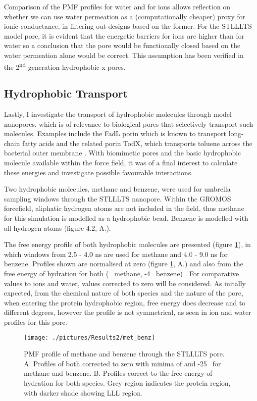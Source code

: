 Comparison of the PMF profiles for water and for ions allows reflection on whether we can use water permeation as a (computationally cheaper) proxy for ionic conductance, in filtering out designs based on the former. For the STLLLTS model pore, it is evident that the energetic barriers for ions are higher than for water so a conclusion that the pore would be functionally closed based on the water permeation alone would be correct. This assumption has been verified in the 2\textsuperscript{nd} generation hydrophobic-x pores. 

\subsection{Hydrophobic Transport}

Lastly, I investigate the transport of hydrophobic molecules through model nanopores, which is of relevance to biological pores that selectively transport such molecules. Examples include the FadL porin which is known to transport long-chain fatty acids \cite{VandenBerg2004b,Zou2008} and the related porin TodX, which transports toluene across the bacterial outer membrane \cite{Hearn2008}. With biomimetic pores and the basic hydrophobic molecule available within the force field, it was of a final interest to calculate these energies and investigate possible favourable interactions.

Two hydrophobic molecules, methane and benzene, were used for umbrella sampling windows through the STLLLTS nanopore. Within the GROMOS forcefield, aliphatic hydrogen atoms are not included in the field, thus methane for this simulation is modelled as a hydrophobic bead. Benzene is modelled with all hydrogen atoms (figure 4.2, A.).

The free energy profile of both hydrophobic molecules are presented (figure \ref{fig:met_benz}), in which windows from 2.5 - 4.0 ns are used for methane and 4.0 - 9.0 ns for benzene. Profiles shown are normalised at zero (figure \ref{fig:met_benz}, A.) and also from the free energy of hydration for both ( \kj\ methane, -4 \kj\ benzene) \cite{Abraham1984}. For comparative values to ions and water, values corrected to zero will be considered.  As initally expected, from the chemical nature of both species and the nature of the pore, when entering the protein hydrophobic region, free energy does decrease and to different degrees, however the profile is not symmetrical, as seen in ion and water profiles for this pore. 


\begin{figure}[H]
\begin{center}
\texttt{[image: ./pictures/Results2/met\_benz]}
\caption[PMF profile of methane and benzene through the STLLLTS pore.] {PMF profile of methane and benzene through the STLLLTS pore. A. Profiles of both corrected to zero with minima of  and -25 \kj\ for methane and benzene. B. Profiles correct to the free energy of hydration for both species. Grey region indicates the protein region, with darker shade showing LLL region.}  %
\label{fig:met_benz}
\end{center}
\end{figure}

